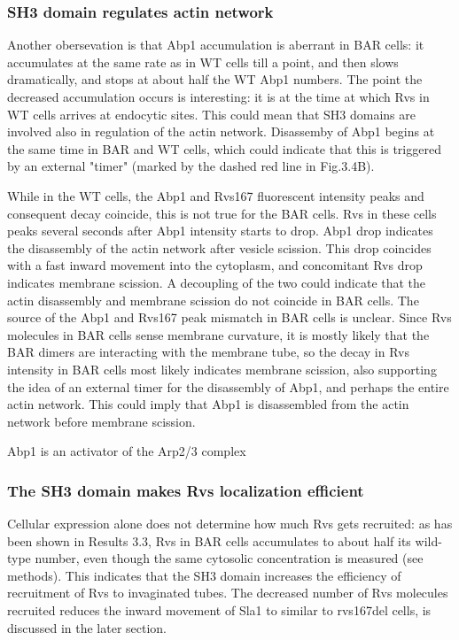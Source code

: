 \subsubsection{SH3 domain regulates actin network} 
Another obersevation is that Abp1 accumulation is aberrant in BAR cells: it accumulates at the same rate as in WT cells till a point, and then slows dramatically, and stops at about half the WT Abp1 numbers.
The point the decreased accumulation occurs is interesting: it is at the time at which Rvs in WT cells arrives at endocytic sites. This could mean that SH3 domains are involved also in regulation of the actin network. Disassemby of Abp1 begins at the same time in BAR and WT cells, which could indicate that this is triggered by an external "timer" (marked by the dashed red line in Fig.3.4B). 

While in the WT cells, the Abp1 and Rvs167 fluorescent intensity peaks and consequent decay coincide, this is not true for the BAR cells. Rvs in these cells peaks several seconds after Abp1 intensity starts to drop. Abp1 drop indicates the disassembly of the actin network after vesicle scission. This drop coincides with a fast inward movement into the cytoplasm, and concomitant Rvs drop indicates membrane scission. A decoupling of the two could indicate that the actin disassembly and membrane scission do not coincide in BAR cells. The source of the Abp1 and Rvs167 peak mismatch in BAR cells is unclear. Since Rvs molecules in BAR cells sense membrane curvature, it is mostly likely that the BAR dimers are interacting with the membrane tube, so the decay in Rvs intensity in BAR cells most likely indicates membrane scission, also supporting the idea of an external timer for the disassembly of Abp1, and perhaps the entire actin network. This could imply that Abp1 is disassembled from the actin network before membrane scission. 

Abp1 is an activator of the Arp2/3 complex 

\subsubsection{The SH3 domain makes Rvs localization efficient}
Cellular expression alone does not determine how much Rvs gets recruited: as has been shown in Results 3.3, Rvs in BAR cells accumulates to about half its wild-type number, even though the same cytosolic concentration is measured (see methods). This indicates that the SH3 domain increases the efficiency of recruitment of Rvs to invaginated tubes. The decreased number of Rvs molecules recruited reduces the inward movement of Sla1 to similar to rvs167del cells, is discussed in the later section.

